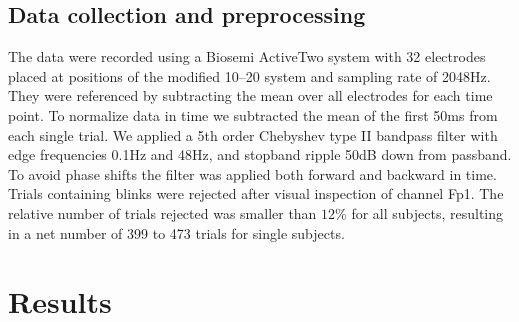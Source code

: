 \documentclass[a4paper,twocolumn]{article}
\begin{document}
\subsection*{Data collection and preprocessing}
The data were recorded using a Biosemi ActiveTwo system with 32 electrodes placed at positions of the modified 10--20 system and sampling rate of 2048Hz. They were referenced by subtracting the mean over all electrodes for each time point. To normalize data in time we subtracted the mean of the first 50ms from each single trial. We applied a 5th order Chebyshev type II bandpass filter with edge frequencies 0.1Hz and 48Hz, and stopband ripple 50dB down from passband. To avoid phase shifts the filter was applied both forward and backward in time.
Trials containing blinks were rejected after visual inspection of channel Fp1. The relative number of trials rejected was smaller than $12\%$ for all subjects, resulting in a net number of 399 to 473 trials for single subjects. 
\section*{Results}
\end{document}
